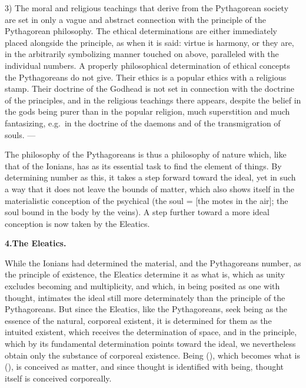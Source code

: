 3) The moral and religious teachings that derive from the Pythagorean
society are set in only a vague and abstract connection with the
principle of the Pythagorean philosophy. The ethical determinations are
either immediately placed alongside the principle, as when it is said:
virtue is harmony, or they are, in the arbitrarily symbolizing manner
touched on above, paralleled with the individual numbers. A properly
philosophical determination of ethical concepts the Pythagoreans do not
give. Their ethics is a popular ethics with a religious stamp. Their
doctrine of the Godhead is not set in connection with the doctrine of
the principles, and in the religious teachings there appears, despite
the belief in the gods being purer than in the popular religion, much
superstition and much fantasizing, e.g.\ in the doctrine of the daemons
and of the transmigration of souls. ---

The philosophy of the Pythagoreans is thus a philosophy of nature
which, like that of the Ionians, has as its essential task to find the
element of things. By determining number as this, it takes a step
forward toward the ideal, yet in such a way that it does not leave the
bounds of matter, which also shows itself in the materialistic
conception of the psychical (the soul = 
[the motes in the air]; the soul bound in the body by the veins). A
step further toward a more ideal conception is now taken by the
Eleatics.

\divrule

\begin{center}
\textbf{4.\enspace The Eleatics.}
\end{center}

While the Ionians had determined the material, and the Pythagoreans number, as the principle of existence, the Eleatics determine it
as what is, which as unity excludes becoming and
multiplicity, and which, in being posited as one with thought,
intimates the ideal still more determinately than the principle of the Pythagoreans.
But since the Eleatics, like the Pythagoreans, seek being as
the essence of the natural, corporeal existent, it is determined
for them as the intuited existent, which receives the determination of space, and in the principle, which by its fundamental determination points
toward the ideal, we nevertheless obtain only the substance of corporeal
existence. Being (), which becomes what is
(), is conceived as matter, and since thought is identified
with being, thought itself is conceived corporeally.

